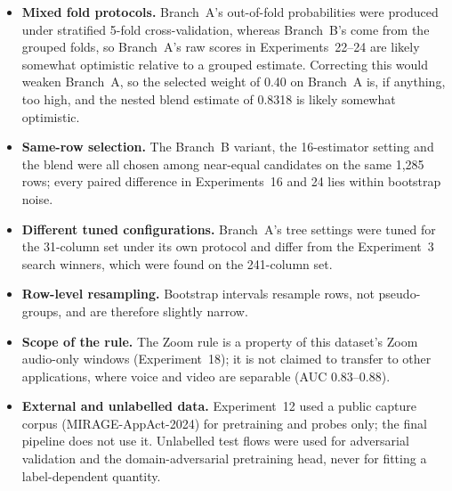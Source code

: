 \begin{itemize}
\item \textbf{Mixed fold protocols.} Branch~A's out-of-fold probabilities were
produced under stratified 5-fold cross-validation, whereas Branch~B's come from the
grouped folds, so Branch~A's raw scores in Experiments~22--24 are likely somewhat
optimistic relative to a grouped estimate. Correcting this would weaken Branch~A, so
the selected weight of 0.40 on Branch~A is, if anything, too high, and the nested
blend estimate of 0.8318 is likely somewhat optimistic.
\item \textbf{Same-row selection.} The Branch~B variant, the 16-estimator setting and
the blend were all chosen among near-equal candidates on the same 1{,}285 rows; every
paired difference in Experiments~16 and 24 lies within bootstrap noise.
\item \textbf{Different tuned configurations.} Branch~A's tree settings were tuned
for the 31-column set under its own protocol and differ from the Experiment~3 search
winners, which were found on the 241-column set.
\item \textbf{Row-level resampling.} Bootstrap intervals resample rows, not
pseudo-groups, and are therefore slightly narrow.
\item \textbf{Scope of the rule.} The Zoom rule is a property of this dataset's
Zoom audio-only windows (Experiment~18); it is not claimed to transfer to other
applications, where voice and video are separable (AUC 0.83--0.88).
\item \textbf{External and unlabelled data.} Experiment~12 used a public capture
corpus (MIRAGE-AppAct-2024) for pretraining and probes only; the final pipeline does
not use it. Unlabelled test flows were used for adversarial validation and the
domain-adversarial pretraining head, never for fitting a label-dependent quantity.
\end{itemize}
